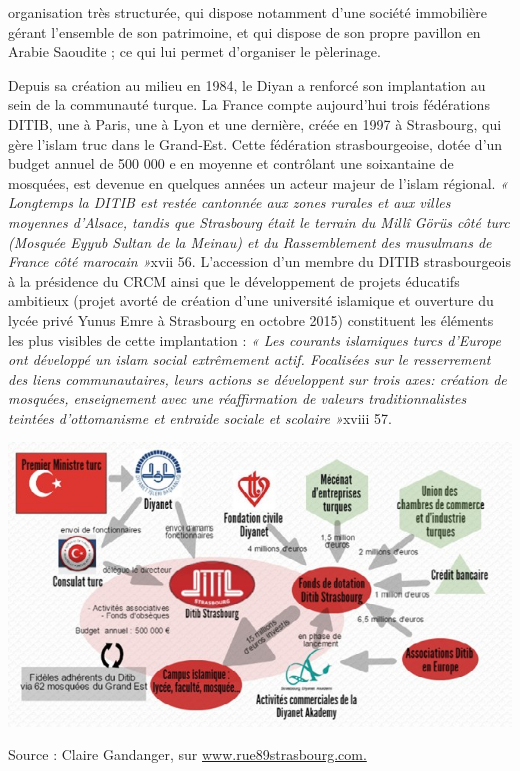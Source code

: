 organisation très structurée, qui dispose notamment d'une société
immobilière gérant l'ensemble de son patrimoine, et qui dispose de son
propre pavillon en Arabie Saoudite ; ce qui lui permet d'organiser le
pèlerinage.

Depuis sa création au milieu en 1984, le Diyan a renforcé son
implantation au sein de la communauté turque. La France compte
aujourd'hui trois fédérations DITIB, une à Paris, une à Lyon et une
dernière, créée en 1997 à Strasbourg, qui gère l'islam truc dans le
Grand-Est. Cette fédération strasbourgeoise, dotée d'un budget annuel de
500 000 e en moyenne et contrôlant une soixantaine de mosquées, est
devenue en quelques années un acteur majeur de l'islam régional. \emph{«
Longtemps la DITIB est restée cantonnée aux zones rurales et aux villes
moyennes d'Alsace, tandis que Strasbourg était le terrain du Millî Görüs
côté turc (Mosquée Eyyub Sultan de la Meinau) et du Rassemblement des
musulmans de France côté marocain »}xvii 56. L'accession d'un membre du
DITIB strasbourgeois à la présidence du CRCM ainsi que le développement
de projets éducatifs ambitieux (projet avorté de création d'une
université islamique et ouverture du lycée privé Yunus Emre à Strasbourg
en octobre 2015) constituent les éléments les plus visibles de cette
implantation : \emph{« Les courants islamiques turcs d'Europe ont
développé un islam social extrêmement actif. Focalisées sur le
resserrement des liens communautaires, leurs actions se développent sur
trois axes: création de mosquées, enseignement avec une réaffirmation de
valeurs traditionnalistes teintées d'ottomanisme et entraide sociale et
scolaire »}xviii 57.


\includegraphics[width=\textwidth]{ImageIslamFrance/media/image8.jpeg}


Source : Claire Gandanger, sur
\href{http://www.rue89strasbourg.com/}{www.rue89strasbourg.com.}

